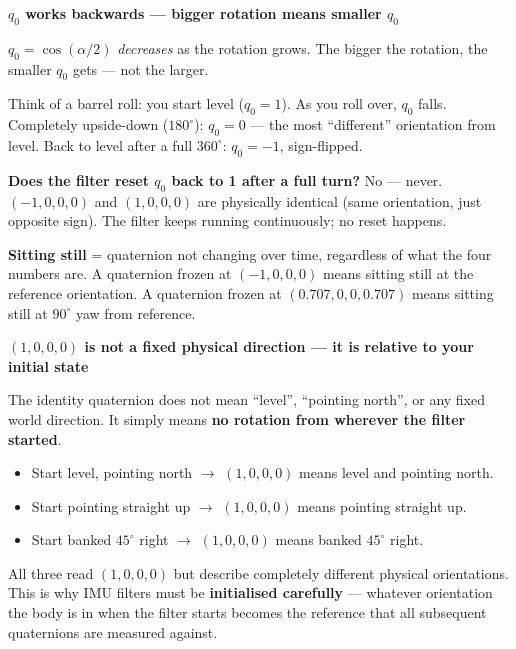 \documentclass[12pt, a4paper]{article}
\begin{document}
\begin{warnbox}
  \textbf{$q_0$ works backwards --- bigger rotation means smaller $q_0$}

  $q_0 = \cos(\alpha/2)$ \emph{decreases} as the rotation grows.
  The bigger the rotation, the smaller $q_0$ gets --- not the larger.

  Think of a barrel roll: you start level ($q_0 = 1$).
  As you roll over, $q_0$ falls.
  Completely upside-down ($180^\circ$): $q_0 = 0$ --- the most
  ``different'' orientation from level.
  Back to level after a full $360^\circ$: $q_0 = -1$, sign-flipped.

  \textbf{Does the filter reset $q_0$ back to 1 after a full turn?}
  No --- never.
  $(-1, 0, 0, 0)$ and $(1, 0, 0, 0)$ are physically identical
  (same orientation, just opposite sign).
  The filter keeps running continuously; no reset happens.

  \textbf{Sitting still} = quaternion not changing over time,
  regardless of what the four numbers are.
  A quaternion frozen at $(-1, 0, 0, 0)$ means sitting still at the
  reference orientation.
  A quaternion frozen at $(0.707, 0, 0, 0.707)$ means sitting still at
  $90^\circ$ yaw from reference.
\end{warnbox}

\begin{warnbox}
  \textbf{$(1,0,0,0)$ is not a fixed physical direction --- it is
  relative to your initial state}

  The identity quaternion does not mean ``level'', ``pointing north'',
  or any fixed world direction.
  It simply means \textbf{no rotation from wherever the filter started}.

  \begin{itemize}[leftmargin=1.2em, itemsep=2pt]
    \item Start level, pointing north $\to$ $(1,0,0,0)$ means level
      and pointing north.
    \item Start pointing straight up $\to$ $(1,0,0,0)$ means pointing
      straight up.
    \item Start banked $45^\circ$ right $\to$ $(1,0,0,0)$ means banked
      $45^\circ$ right.
  \end{itemize}

  All three read $(1,0,0,0)$ but describe completely different physical
  orientations.
  This is why IMU filters must be \textbf{initialised carefully} ---
  whatever orientation the body is in when the filter starts becomes
  the reference that all subsequent quaternions are measured against.
\end{warnbox}
\end{document}

